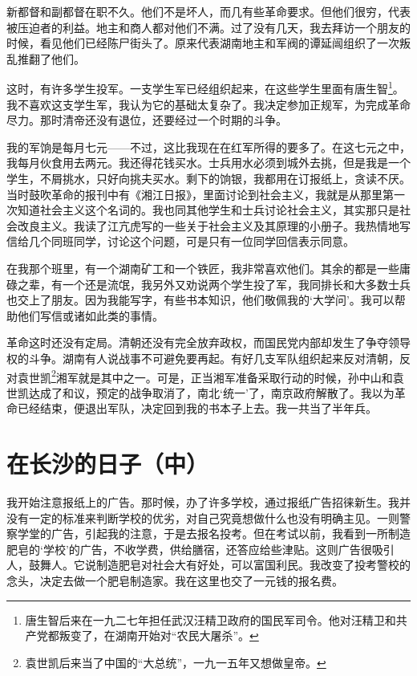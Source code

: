 \documentclass[10pt]{book}
\begin{document}
新都督和副都督在职不久。他们不是坏人，而几有些革命要求。但他们很穷，代表被压迫者的利益。地主和商人都对他们不满。过了没有几天，我去拜访一个朋友的时候，看见他们已经陈尸街头了。原来代表湖南地主和军阀的谭延闿组织了一次叛乱推翻了他们。

这时，有许多学生投军。一支学生军已经组织起来，在这些学生里面有唐生智\footnote{唐生智后来在一九二七年担任武汉汪精卫政府的国民军司令。他对汪精卫和共产党都叛变了，在湖南开始对“农民大屠杀”。}。我不喜欢这支学生军，我认为它的基础太复杂了。我决定参加正规军，为完成革命尽力。那时清帝还没有退位，还要经过一个时期的斗争。

我的军饷是每月七元——不过，这比我现在在红军所得的要多了。在这七元之中，我每月伙食用去两元。我还得花钱买水。士兵用水必须到城外去挑，但是我是一个学生，不屑挑水，只好向挑夫买水。剩下的饷银，我都用在订报纸上，贪读不厌。当时鼓吹革命的报刊中有《湘江日报》，里面讨论到社会主义，我就是从那里第一次知道社会主义这个名词的。我也同其他学生和士兵讨论社会主义，其实那只是社会改良主义。我读了江亢虎写的一些关于社会主义及其原理的小册子。我热情地写信给几个同班同学，讨论这个问题，可是只有一位同学回信表示同意。

在我那个班里，有一个湖南矿工和一个铁匠，我非常喜欢他们。其余的都是一些庸碌之辈，有一个还是流氓，我另外又劝说两个学生投了军，我同排长和大多数士兵也交上了朋友。因为我能写字，有些书本知识，他们敬佩我的‘大学问’。我可以帮助他们写信或诸如此类的事情。

革命这时还没有定局。清朝还没有完全放弃政权，而国民党内部却发生了争夺领导权的斗争。湖南有人说战事不可避免要再起。有好几支军队组织起来反对清朝，反对袁世凯\footnote{袁世凯后来当了中国的“大总统”，一九一五年又想做皇帝。}湘军就是其中之一。可是，正当湘军准备采取行动的时候，孙中山和袁世凯达成了和议，预定的战争取消了，南北‘统一’了，南京政府解散了。我以为革命已经结束，便退出军队，决定回到我的书本子上去。我一共当了半年兵。



\section{在长沙的日子（中）}

我开始注意报纸上的广告。那时候，办了许多学校，通过报纸广告招徕新生。我并没有一定的标准来判断学校的优劣，对自己究竟想做什么也没有明确主见。一则警察学堂的广告，引起我的注意，于是去报名投考。但在考试以前，我看到一所制造肥皂的‘学校’的广告，不收学费，供给膳宿，还答应给些津贴。这则广告很吸引人，鼓舞人。它说制造肥皂对社会大有好处，可以富国利民。我改变了投考警校的念头，决定去做一个肥皂制造家。我在这里也交了一元钱的报名费。
\end{document}
